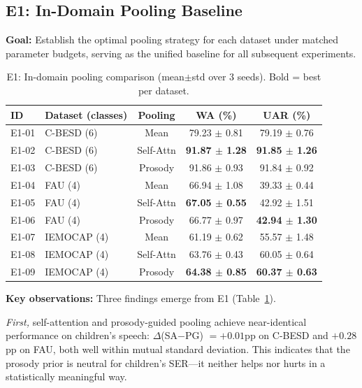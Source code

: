 \documentclass[11pt,a4paper]{article}
\begin{document}
\subsection{E1: In-Domain Pooling Baseline}
\label{ssec:e1}

\textbf{Goal:} Establish the optimal pooling strategy for each dataset under
matched parameter budgets, serving as the unified baseline for all subsequent
experiments.

\begin{table}[t]
\centering
\caption{E1: In-domain pooling comparison (mean$\pm$std over 3 seeds). Bold = best per dataset.}
\label{tab:e1}
\begin{tabular}{llccc}
\toprule
\textbf{ID} & \textbf{Dataset (classes)} & \textbf{Pooling} & \textbf{WA (\%)} & \textbf{UAR (\%)} \\
\midrule
E1-01 & C-BESD (6) & Mean          & 79.23 $\pm$ 0.81 & 79.19 $\pm$ 0.76 \\
E1-02 & C-BESD (6) & Self-Attn     & \textbf{91.87 $\pm$ 1.28} & \textbf{91.85 $\pm$ 1.26} \\
E1-03 & C-BESD (6) & Prosody       & 91.86 $\pm$ 0.93 & 91.84 $\pm$ 0.92 \\
\midrule
E1-04 & FAU (4)    & Mean          & 66.94 $\pm$ 1.08 & 39.33 $\pm$ 0.44 \\
E1-05 & FAU (4)    & Self-Attn     & \textbf{67.05 $\pm$ 0.55} & 42.92 $\pm$ 1.51 \\
E1-06 & FAU (4)    & Prosody       & 66.77 $\pm$ 0.97 & \textbf{42.94 $\pm$ 1.30} \\
\midrule
E1-07 & IEMOCAP (4)& Mean          & 61.19 $\pm$ 0.62 & 55.57 $\pm$ 1.48 \\
E1-08 & IEMOCAP (4)& Self-Attn     & 63.76 $\pm$ 0.43 & 60.05 $\pm$ 0.64 \\
E1-09 & IEMOCAP (4)& Prosody       & \textbf{64.38 $\pm$ 0.85} & \textbf{60.37 $\pm$ 0.63} \\
\bottomrule
\end{tabular}
\end{table}

\noindent\textbf{Key observations:} Three findings emerge from E1 (Table~\ref{tab:e1}).

\textit{First,} self-attention and prosody-guided pooling achieve near-identical
performance on children's speech: $\Delta$(SA$-$PG) $= +0.01$pp on C-BESD and
$+0.28$pp on FAU, both well within mutual standard deviation. This indicates
that the prosody prior is neutral for children's SER---it neither helps nor
hurts in a statistically meaningful way.
\end{document}
